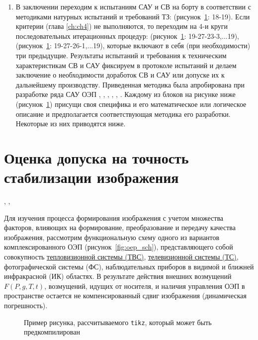 \begin{enumerate}
	\item В заключении переходим к испытаниям САУ и СВ на борту в соответствии с методиками натурных испытаний и требований ТЗ: (рисунок~\ref{fig:tikz_example}: 18-19). Если критерии (глава \ref{ch:ch4}) не выполняются, то переходим  на 
	4-и круги последовательных итерационных процедур: (рисунок~\ref{fig:tikz_example}: 19-27-23-3,...19), (рисунок~\ref{fig:tikz_example}: 19-27-26-1,...19), которые включают в себя (при необходимости) три предыдущие. Результаты испытаний и требования к техническим характеристикам СВ и САУ фиксируем в протоколе испытаний и делаем заключение о необходимости доработок СВ и САУ или допуске их к дальнейшему производству.
	Приведенная методика была апробирована при разработке ряда САУ ОЭП \cite[]{Belyakov}, \cite[]{Karpov}, \cite[]{Baloev16}, \cite[]{Karpov17}, \cite[]{Gerasin19}, \cite[]{Molin21}. Каждому из блоков на рисунке ниже (рисунок~\ref{fig:tikz_example}) присущи своя специфика и его математическое или логическое описание и предполагается соответствующая методика его разработки. Некоторые из них приводятся ниже.

\end{enumerate}

\section{Оценка допуска на точность стабилизации изображения} \cite[]{Belyakov}, \cite[]{Sokolski22}, \cite[]{Molin21} \label{sec:ch2/sec2} 



Для изучения процесса формирования изображения с учетом множества факторов, влияющих на формирование, преобразование и передачу качества изображения, рассмотрим функциональную схему одного из вариантов комплексированного ОЭП (рисунок~\ref{fig:oep_sch}), представляющего собой совокупность \hyperref[acroTVS]{тепловизионной системы (ТВС)}, \hyperref[acroTS]{телевизионной системы (ТС)}, фотографической системы (ФС), наблюдательных приборов в видимой и ближней инфракрасной (ИК) областях. В результате действия внешних возмущений $F(P,g,T,t)$, возмущений, идущих от носителя, и наличия управления ОЭП в пространстве остается не компенсированный сдвиг изображения (динамическая погрешность).


\begin{figure}[ht]
	{\centering
		
		
	}
	\legend{}
	\caption[Пример \texttt{tikz} схемы]{Пример рисунка, рассчитываемого
		\texttt{tikz}, который может быть предкомпилирован}
	\label{fig:tikz_example}
\end{figure}


